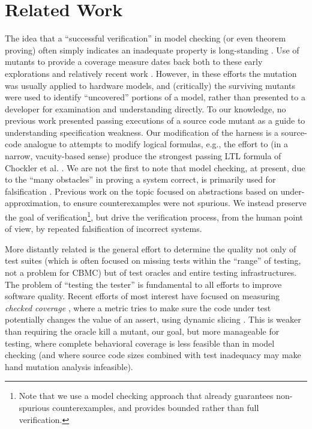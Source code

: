 \documentclass[conference]{IEEEtran}
\begin{document}
\section{Related Work}

The idea that a ``successful verification'' in model checking (or even
theorem proving) often simply indicates an inadequate property is
long-standing \cite{PracticalCov,Hoskote}. Use of mutants
\cite{MutSpec,MutCov} to provide a coverage measure dates back both to
these early explorations and relatively recent work \cite{MutInterp}.
However, in these efforts the mutation was usually applied to hardware
models, and (critically) the surviving mutants were used to identify
``uncovered'' portions of a model, rather than presented to a
developer for examination and understanding directly.  To our
knowledge, no previous work presented passing executions of a source
code mutant as a guide to understanding specification weakness.  Our
modification of the harness is a source-code analogue to attempts to
modify logical formulas, e.g., the effort to (in a narrow,
vacuity-based sense) produce the strongest passing LTL formula
of Chockler et al. \cite{BeyondVac}.  We are not the first to note
that model checking, at present, due to the ``many obstacles'' in
proving a system correct, is primarily used for falsification
\cite{AbsFals}.  Previous work on the topic \cite{AbsFals} focused on
abstractions based on under-approximation, to ensure counterexamples
were not spurious. We instead preserve the goal of
verification\footnote{Note that we use a model checking approach that
  already guarantees non-spurious counterexamples, and provides
  bounded rather than full verification.}, but drive the verification
process, from the human point of view, by repeated falsification of
incorrect systems.

More distantly related is the general effort to determine the quality
not only of test suites (which is often focused on missing tests
within the ``range'' of testing, not a problem for CBMC) but of test
oracles and entire testing infrastructures.  The problem of ``testing
the tester'' \cite{WODA09} is fundamental to all efforts
to improve software quality.  Recent efforts of most interest have
focused on measuring \emph{checked coverage} \cite{CheckedCov,CheckedJournal,ThereYet}, where
a metric tries to make sure the code under test potentially changes
the value of an assert, using dynamic slicing \cite{DynSlice,Tip}.  This is weaker than requiring the oracle kill
a mutant, our goal, but more manageable for testing, where complete
behavioral coverage is less feasible than in model checking (and where
source code sizes combined with test inadequacy may make hand mutation analysis infeasible).
\end{document}
